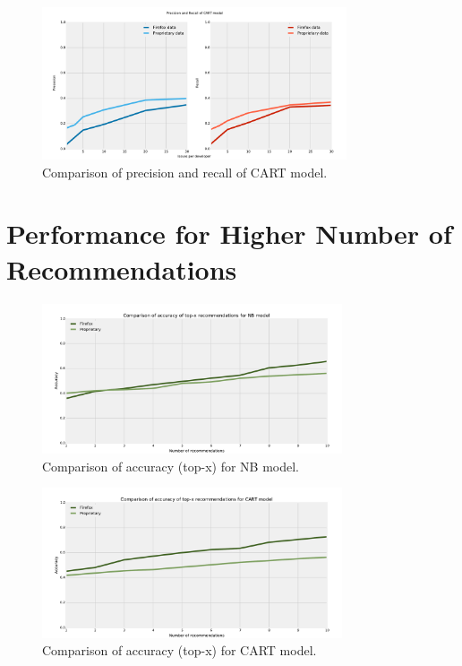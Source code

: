 \documentclass[nopalatino,nolot,nolof,color]{fithesis3}
\begin{document}
 \begin{figure}[htbp]
    \centering
        \includegraphics[width=340px]{./images/prop_vs_os/cart_precision_and_recall.pdf}
    \caption{Comparison of precision and recall of CART model.}
    \label{fig:results.datasets.cart_pr}
 \end{figure}

 \clearpage
 \section{Performance for Higher Number of Recommendations}

 \begin{figure}[htbp]
    \centering
        \includegraphics[width=335px]{./images/top_x_comparison/nb_accuracy.pdf}
    \caption{Comparison of accuracy (top-x) for NB model.}
    \label{fig:results.topx.nb_accuracy}
 \end{figure}

 \begin{figure}[htbp]
    \centering
        \includegraphics[width=335px]{./images/top_x_comparison/cart_accuracy.pdf}
    \caption{Comparison of accuracy (top-x) for CART model.}
    \label{fig:results.topx.cart_accuracy}
 \end{figure}
\end{document}
